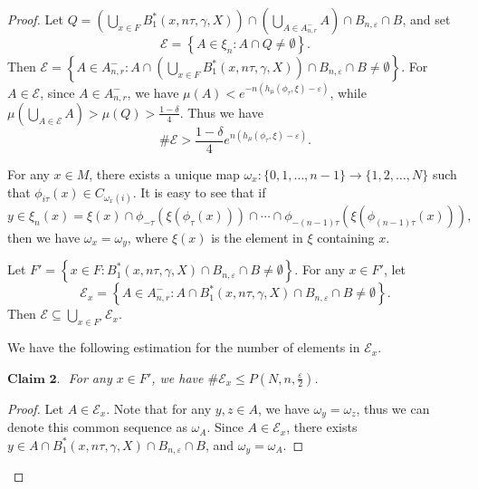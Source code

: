 \documentclass[10pt]{article}
\newtheorem*{Theorem A}{Theorem A}
\begin{document}
\begin{proof}
Let
\(
Q = \left( \bigcup\limits_{x \in F} B_1^*(x, n\tau, \gamma, X) \right) \cap \left( \bigcup\limits_{A \in A^-_{n, r}} A \right) \cap B_{n, \varepsilon} \cap B \), and set
\[
\mathcal{E} = \left\{ A \in \xi_{n} : A \cap Q \neq \emptyset \right\}.
\]
Then \( \mathcal{E} = \left\{ A \in A^-_{n,r} : A \cap \left( \bigcup\limits_{x \in F} B_1^*(x, n\tau, \gamma, X) \right) \cap B_{n,\varepsilon} \cap B \neq \emptyset \right\} \). For \( A \in \mathcal{E} \), since \( A \in {A}_{n,r}^- \), we have \( \mu(A) < e^{-n(h_\mu(\phi_\tau, \xi) - \varepsilon)} \), while \( \mu\left( \bigcup\limits_{A \in \mathcal{E}} A \right) > \mu(Q) > \frac{1 - \delta}{4} \). Thus we have
\[
\#\mathcal{E} > \frac{1 - \delta}{4} e^{n(h_\mu(\phi_\tau, \xi) - \varepsilon)}.
\]

For any \( x \in M \), there exists a unique map \( \omega_x: \{0, 1, \ldots, n - 1\} \to \{1, 2, \ldots, N\} \) such that \( \phi_{i\tau}(x)\in C_{\omega_x(i)} \). It is easy to see that if
\[
y \in \xi_n(x) = \xi(x) \cap \phi_{-\tau}(\xi(\phi_\tau(x))) \cap \cdots \cap \phi_{-(n-1)\tau}(\xi(\phi_{(n-1)\tau}(x))),
\]
then we have \( \omega_x = \omega_y \), where \( \xi(x) \) is the element in \( \xi \) containing \( x \).

Let \( F' = \left\{ x \in F : B_1^*(x, n\tau, \gamma, X) \cap B_{n,\varepsilon} \cap B \neq \emptyset \right\} \). For any \( x \in F' \), let
\[
\mathcal{E}_x = \left\{ A \in {A}_{n,r}^- : A \cap B_1^*(x, n\tau, \gamma, X) \cap B_{n,\varepsilon} \cap B \neq \emptyset \right\}. \tag{4}
\]
Then \( \mathcal{E} \subseteq \bigcup\limits_{x \in F'} \mathcal{E}_x \).

We have the following estimation for the number of elements in \( \mathcal{E}_x \).

\bigskip
\noindent
\(\textbf{Claim 2. }\) {\it For any \( x \in F' \), we have \( \#\mathcal{E}_x \leq P(N, n, \frac{\varepsilon}{2}) \).}



\begin{proof}
Let \( A \in \mathcal{E}_x \). Note that for any \( y, z \in A \), we  have \( \omega_y = \omega_z \), thus we can denote this common sequence as \( \omega_A \). Since \( A \in \mathcal{E}_x \), there exists \( y \in A \cap B_1^*(x, n\tau, \gamma, X) \cap B_{n, \varepsilon} \cap B \), and \( \omega_y = \omega_A \).


\end{proof}
\end{proof}
\end{document}
